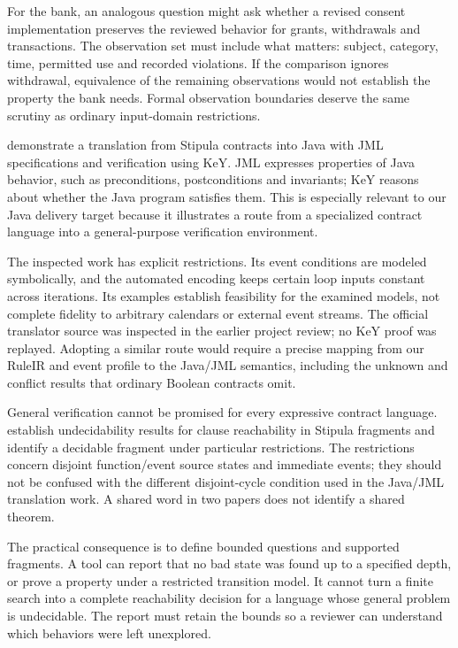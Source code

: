 \documentclass[12pt,a4paper,oneside,openany]{book}
\begin{document}
For the bank, an analogous question might ask whether a revised consent
implementation preserves the reviewed behavior for grants, withdrawals and
transactions. The observation set must include what matters: subject, category,
time, permitted use and recorded violations. If the comparison ignores
withdrawal, equivalence of the remaining observations would not establish the
property the bank needs. Formal observation boundaries deserve the same
scrutiny as ordinary input-domain restrictions.

\citet{stipulakey2025} demonstrate a translation from Stipula contracts into
Java with JML specifications and verification using KeY. JML expresses properties
of Java behavior, such as preconditions, postconditions and invariants; KeY
reasons about whether the Java program satisfies them. This is especially
relevant to our Java delivery target because it illustrates a route from a
specialized contract language into a general-purpose verification environment.

The inspected work has explicit restrictions. Its event conditions are modeled
symbolically, and the automated encoding keeps certain loop inputs constant
across iterations. Its examples establish feasibility for the examined models,
not complete fidelity to arbitrary calendars or external event streams. The
official translator source was inspected in the earlier project review; no KeY
proof was replayed. Adopting a similar route would require a precise mapping
from our RuleIR and event profile to the Java/JML semantics, including the
unknown and conflict results that ordinary Boolean contracts omit.

General verification cannot be promised for every expressive contract language.
\citet{reachability2026} establish undecidability results for clause reachability
in Stipula fragments and identify a decidable fragment under particular
restrictions. The restrictions concern disjoint function/event source states
and immediate events; they should not be confused with the different
disjoint-cycle condition used in the Java/JML translation work. A shared word
in two papers does not identify a shared theorem.

The practical consequence is to define bounded questions and supported
fragments. A tool can report that no bad state was found up to a specified
depth, or prove a property under a restricted transition model. It cannot
turn a finite search into a complete reachability decision for a language
whose general problem is undecidable. The report must retain the bounds so a
reviewer can understand which behaviors were left unexplored.
\end{document}
